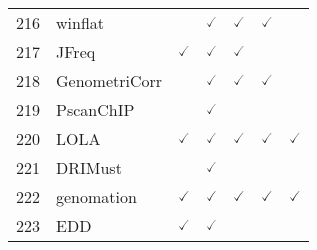 \documentclass[10pt,letterpaper]{article}
\begin{document}
\begin{table}[!ht]
\begin{adjustwidth}{-2.25in}{0in}
\begin{tabular}{|c|l|c|c|c|c|c|}
216 & winflat\cite{audic1997significance} & & $\checked$ & $\checked$ & $\checked$ & \\
217 & JFreq\cite{botez2007improved} & $\checked$ & $\checked$ & $\checked$ & & \\ 
218 & GenometriCorr\cite{favorov2012exploring} & & $\checked$ & $\checked$ & $\checked$ & \\ 
219 & PscanChIP\cite{zambelli2013pscanchip} & & $\checked$ & & & \\ 
220 & LOLA\cite{sheffield2015lola} & $\checked$ & $\checked$ & $\checked$ & $\checked$ & $\checked$  \\
221 & DRIMust\cite{leibovich2013drimust} & & $\checked$ & & & \\ 
222 & genomation\cite{akalin2014genomation} & $\checked$ & $\checked$ & $\checked$ & $\checked$ & $\checked$  \\ 
223 & EDD\cite{morrell2017experiment} & $\checked$ & $\checked$ & & & \\ \hline
\end{tabular}
\label{table1}
\end{adjustwidth}
\end{table}
\end{document}
